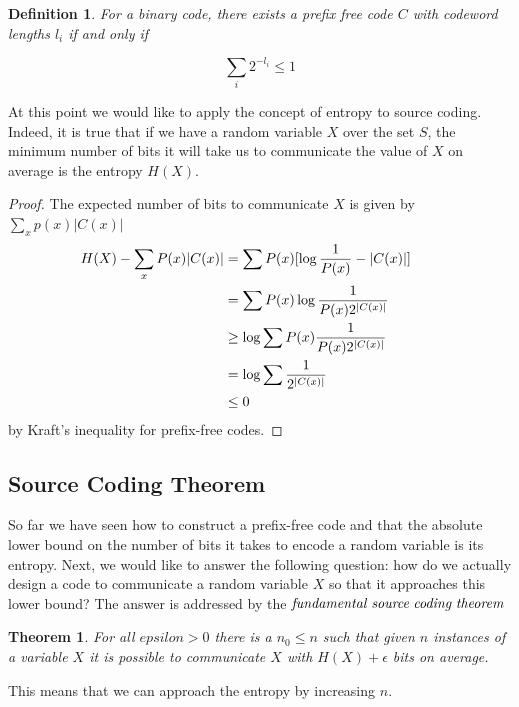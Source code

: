 \documentclass[a4paper,11pt]{book}
\newtheorem{theorem}{Theorem}
\newtheorem{definition}{Definition}
\begin{document}
\begin{definition}
For a binary code, there exists a prefix free code $C$ with codeword lengths $l_{i}$ if and only if
\end{definition}

\begin{equation}
\sum_{i} 2^{-l_{i}} \leq 1
\end{equation}

At this point we would like to apply the concept of entropy to source coding. Indeed, it is true that if we have a random variable $X$ over the set $S$, the minimum number of bits it will take us to communicate the value of $X$ on average is the entropy $H(X)$.

\begin{proof}
  The expected number of bits to communicate $X$ is given by $\sum_{x}p(x)|C(x)|$
  \begin{align*}
    H(X) - \sum_{x}P(x)|C(x)| &= \sum P(x)[\log\frac{1}{P(x)} - |C(x)|] \\
    &= \sum P(x)\log\frac{1}{P(x)2^{|C(x)|}} \\
    &\geq \log\sum P(x)\frac{1}{P(x)2^{|C(x)|}}  \\
    &= \log\sum \frac{1}{2^{|C(x)|}}  \\
    &\leq 0 &&\qedhere
  \end{align*}
  by Kraft's inequality for prefix-free codes.
\end{proof}

\subsection{Source Coding Theorem}

So far we have seen how to construct a prefix-free code and that the absolute lower bound on the number of bits it takes to encode a random variable is its entropy. Next, we would like to answer the following question: how do we actually design a code to communicate a random variable $X$ so that it approaches this lower bound?  The answer is addressed by the $\it{fundamental \; source \; coding \; theorem}$ 

\begin{theorem}
For all $epsilon > 0$ there is a $n_{0} \leq n$ such that given $n$ instances of a variable $X$ it is possible to communicate $X$ with $H(X) + \epsilon$ bits on average.
\end{theorem}

This means that we can approach the entropy by increasing $n$.
\end{document}

